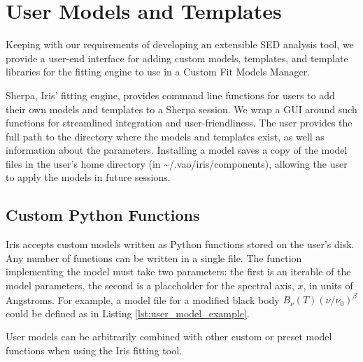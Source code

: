\documentclass[5p]{elsarticle}
\begin{document}

\section{User Models and Templates}
\label{sec:usermodels}

Keeping with our requirements of developing an extensible SED analysis tool, we provide a user-end interface for adding custom models, templates, and template libraries for the fitting engine to use in a Custom Fit Models Manager.

Sherpa, Iris' fitting engine, provides command line functions for users to add their own models and templates to a Sherpa session. We wrap a GUI around such functions for streamlined integration and user-friendliness.
The user provides the full path to the directory where the models and templates exist, as well as information about the parameters. Installing a model saves a copy of the model files in the user's home directory (in \~{}/.vao/iris/components), allowing the user to apply the models in future sessions.


\subsection{Custom Python Functions}
Iris accepts custom models written as Python functions stored on the user's disk. Any number of functions can be written in a single file. The function implementing the model must take two parameters: the first is an iterable of the model parameters, the second is a placeholder for the spectral axis, $x$, in units of Angstroms. For example, a model file for a modified black body
\(B_{\nu}(T) \left(\nu/\nu_{0}\right)^{\beta}\)
could be defined as in Listing \ref{lst:user_model_example}.

User models can be arbitrarily combined with other custom or preset model functions when using the Iris fitting tool.
\end{document}
